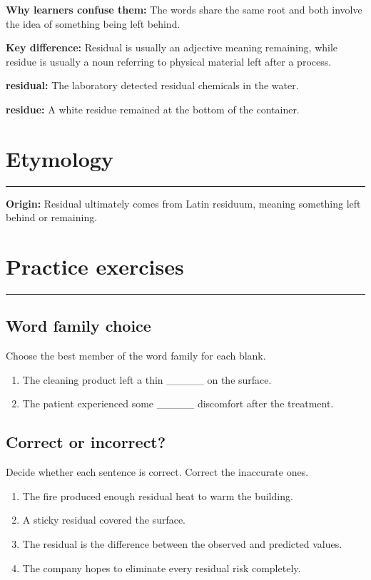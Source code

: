 \documentclass[11pt]{article}
\newcommand{\sectionrule}{\par\vspace{-0.5em}\noindent\textcolor{Accent}{\rule{\linewidth}{0.6pt}}\par}
\begin{document}
\textbf{Why learners confuse them:} The words share the same root and both involve the idea of something being left behind.

\textbf{Key difference:} Residual is usually an adjective meaning remaining, while residue is usually a noun referring to physical material left after a process.

\textbf{residual:} The laboratory detected residual chemicals in the water.

\textbf{residue:} A white residue remained at the bottom of the container.

\section{Etymology}
\sectionrule
\textbf{Origin:} Residual ultimately comes from Latin residuum, meaning something left behind or remaining.

\section{Practice exercises}
\sectionrule
\subsection{Word family choice}
Choose the best member of the word family for each blank.

\begin{enumerate}
  \item The cleaning product left a thin \_\_\_\_\_ on the surface.
  \item The patient experienced some \_\_\_\_\_ discomfort after the treatment.
\end{enumerate}

\subsection{Correct or incorrect?}
Decide whether each sentence is correct. Correct the inaccurate ones.

\begin{enumerate}
  \item The fire produced enough residual heat to warm the building.
  \item A sticky residual covered the surface.
  \item The residual is the difference between the observed and predicted values.
  \item The company hopes to eliminate every residual risk completely.
\end{enumerate}
\end{document}
